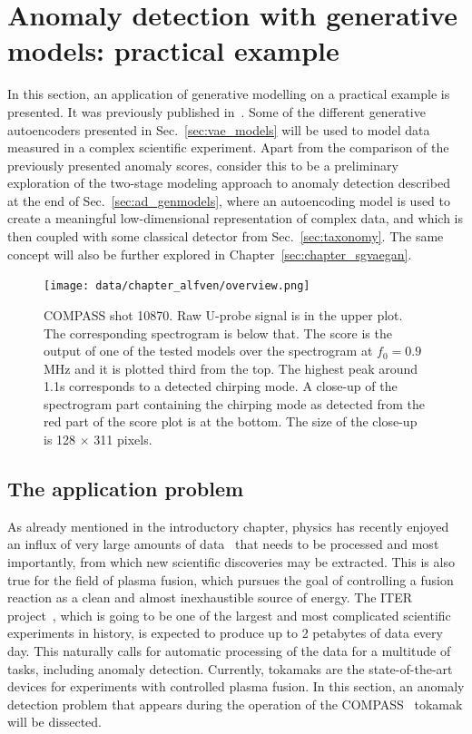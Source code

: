 \section{Anomaly detection with generative models: practical example} \label{sec:alfven}
In this section, an application of generative modelling on a practical example is presented. It was previously published in~\cite{vskvara2020detection}. Some of the different generative autoencoders presented in Sec.~\ref{sec:vae_models} will be used to model data measured in a complex scientific experiment. Apart from the comparison of the previously presented anomaly scores, consider this to be a preliminary exploration of the two-stage modeling approach to anomaly detection described at the end of Sec.~\ref{sec:ad_genmodels}, where an autoencoding model is used to create a meaningful low-dimensional representation of complex data, and which is then coupled with some classical detector from Sec.~\ref{sec:taxonomy}. The same concept will also be further explored in Chapter~\ref{sec:chapter_sgvaegan}.

\begin{figure}[t]%
  \centering
  \texttt{[image: data/chapter\_alfven/overview.png]}
  \caption{COMPASS shot 10870. Raw U-probe signal is in the upper plot. The corresponding spectrogram is below that. The score is the output of one of the tested models over the spectrogram at $f_0=0.9$ MHz and it is plotted third from the top. The highest peak around 1.1s corresponds to a detected chirping mode. A close-up of the spectrogram part containing the chirping mode as detected from the red part of the score plot is at the bottom. The size of the close-up is 128 $\times$ 311 pixels.}
  \label{fig:psd}
\end{figure}

\subsection{The application problem}
As already mentioned in the introductory chapter, physics has recently enjoyed an influx of very large amounts of data~\cite{bird2011computing,ball2010data} that needs to be processed and most importantly, from which new scientific discoveries may be extracted. This is also true for the field of plasma fusion, which pursues the goal of controlling a fusion reaction as a clean and almost inexhaustible source of energy. The ITER project~\cite{holtkamp2007overview}, which is going to be one of the largest and most complicated scientific experiments in history, is expected to produce up to 2 petabytes of data every day. This naturally calls for automatic processing of the data for a multitude of tasks, including anomaly detection. Currently, tokamaks are the state-of-the-art devices for experiments with controlled plasma fusion. In this section, an anomaly detection problem that appears during the operation of the COMPASS~\cite{panek2015status} tokamak will be dissected.

